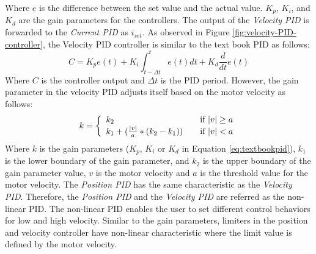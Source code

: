 Where $e$ is the difference between the set value and the actual value. $K_{p}$, $K_ {i}$, and $K_{d}$ are the gain parameters for the controllers.
The output of the \emph{Velocity PID} is forwarded to the \emph{Current PID} as $i_{set}$.
As observed in Figure \ref{fig:velocity-PID-controller}, the Velocity PID controller is similar to the text book PID as follows:
\begin{equation}
\label{eq:textbookpid}
C = K_{p}e(t) + K_{i}\int_{t-\Delta{t}}^{t}e(t)dt + K_{d}\frac{d}{dt}e(t)
\end{equation}
Where $C$ is the controller output and $\Delta t$ is the PID period.
However, the gain parameter in the velocity PID adjusts itself based on the motor velocity as follows:
\begin{equation}\label{eq:gain2-2} 
 k =  \left\{
	 \begin{array}{l l}
    k_{2} & \quad \text{if $\left| v \right| \geq a$}\\
    k_{1} + (\frac{\left| v \right|}{a} * (k_{2} - k_{1}) )  & \quad \text{if $\left| v \right| < a$}
\end{array} \right. 
\end{equation} 
Where $k$ is the gain parameters ($K_{p}$, $K_ {i}$ or $K_{d}$ in Equation \ref{eq:textbookpid}), $k_{1}$ is the lower boundary of the gain parameter, and $k_{2}$ is the upper boundary of the gain parameter value, $v$ is the motor velocity and $a$ is the threshold value for the motor velocity. 
The \emph{Position PID} has the same characteristic as the \emph{Velocity PID}.
Therefore, the \emph{Position PID} and the \emph{Velocity PID} are referred as the non-linear PID.
The non-linear PID enables the user to set different control behaviors for low and high velocity.
Similar to the gain parameters, limiters in the position and velocity controller have non-linear characteristic where the limit value is defined by the motor velocity.

\begin{comment}
In the case of v-ramp mode, the position PID will be disabled and the set velocity is produced by v-ramp generator.
The \emph{textbook} PID controller calculates its output as follows:
\begin{equation}
\label{eq:textbookpid}
C = K_{p}e(t) + K_{i}\int_{t-\Delta{t}}^{t}e(t)dt + K_{d}\frac{d}{dt}e(t)
\end{equation}
\end{comment}


